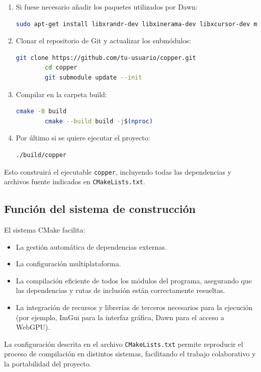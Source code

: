 \begin{enumerate}
    \item Si fuese necesario añadir los paquetes utilizados por Dawn:
          \begin{lstlisting}[language=bash]
        sudo apt-get install libxrandr-dev libxinerama-dev libxcursor-dev mesa-common-dev libx11-xcb-dev pkg-config nodejs npm\end{lstlisting}
    \item Clonar el repositorio de Git y actualizar los submódulos:
          \begin{lstlisting}[language=bash]
        git clone https://github.com/tu-usuario/copper.git
        cd copper
        git submodule update --init\end{lstlisting}
    \item Compilar en la carpeta build:
          \begin{lstlisting}[language=bash]
        cmake -B build
        cmake --build build -j$(nproc)\end{lstlisting}
    \item Por último si se quiere ejecutar el proyecto:
          \begin{lstlisting}[language=bash]
        ./build/copper\end{lstlisting}
\end{enumerate}

Esto construirá el ejecutable \texttt{copper}, incluyendo todas las
dependencias y archivos fuente indicados en \texttt{CMakeLists.txt}.

\subsection{Función del sistema de construcción}

El sistema CMake facilita:

\begin{itemize}
    \item La gestión automática de dependencias externas.
    \item La configuración multiplataforma.
    \item La compilación eficiente de todos los módulos del programa, asegurando que las
          dependencias y rutas de inclusión están correctamente resueltas.
    \item La integración de recursos y librerías de terceros necesarios para la ejecución
          (por ejemplo, ImGui para la interfaz gráfica, Dawn para el acceso a WebGPU).
\end{itemize}

La configuración descrita en el archivo \texttt{CMakeLists.txt} permite
reproducir el proceso de compilación en distintos sistemas, facilitando el
trabajo colaborativo y la portabilidad del proyecto.